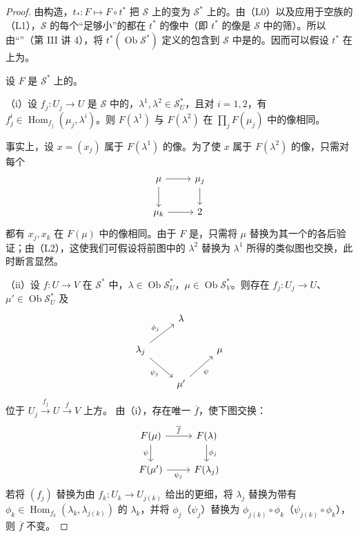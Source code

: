 \begin{proof}
由构造，$t_*:F\mapsto F\circ t^*$ 把 $\mathscr S$ 上的变为 $\mathscr S^*$ 上的。由（L0）以及应用于空族的（L1），$\mathscr S$ 的每个“足够小”的都在 $t^*$ 的像中（即 $t^*$ 的像是 $\mathscr S$ 中的筛）。所以由“”（第 III 讲 4），将 $t^*(\operatorname{Ob}\mathscr S^*)$ 定义的包含到 $\mathscr S$ 中是的。因而可以假设 $t^*$ 在上为。

设 $F$ 是 $\mathscr S^*$ 上的。

（i）设 $f_j:U_j\to U$ 是 $\mathscr S$ 中的，$\lambda^1,\lambda^2\in\mathscr S_U^*$，且对 $i=1,2$，有 $f_j^i\in\operatorname{Hom}_{f_j}(\mu_j,\lambda^i)$。则 $F(\lambda^1)$ 与 $F(\lambda^2)$ 在 $\prod_jF(\mu_j)$ 中的像相同。

事实上，设 $x=(x_j)$ 属于 $F(\lambda^1)$ 的像。为了使 $x$ 属于 $F(\lambda^2)$ 的像，只需对每个
\[\begin{tikzcd}\mu\arrow[r]\arrow[d]&\mu_j\arrow[d]\\\mu_k\arrow[r]&2\end{tikzcd}\]
都有 $x_j,x_k$ 在 $F(\mu)$ 中的像相同。由于 $F$ 是，只需将 $\mu$ 替换为其一个的各后验证；由（L2），这使我们可假设将前图中的 $\lambda^2$ 替换为 $\lambda^1$ 所得的类似图也交换，此时断言显然。

（ii）设 $f:U\to V$ 在 $\mathscr S^*$ 中，$\lambda\in\operatorname{Ob}\mathscr S_U^*$，$\mu\in\operatorname{Ob}\mathscr S_V^*$。则存在 $f_j:U_j\to U$、 $\mu'\in\operatorname{Ob}\mathscr S_U^*$ 及
\[\begin{tikzcd}&\lambda&\\\lambda_j\arrow[ur,"\phi_j"]\arrow[dr,"\psi_j"']&&\mu\\&\mu'\arrow[ur,"\psi"']&\end{tikzcd}\]
位于 $U_j\xrightarrow{f_j}U\xrightarrow{f}V$ 上方。
由（i），存在唯一 $\overline f$，使下图交换：
\[\begin{tikzcd}F(\mu)\arrow[r,"\overline f"]\arrow[d,"\psi"']&F(\lambda)\arrow[d,"\phi_j"]\\
F(\mu')\arrow[r,"\psi_j"']&F(\lambda_j)\end{tikzcd}\]
若将 $(f_j)$ 替换为由 $f_k:U_k\to U_{j(k)}$ 给出的更细，将 $\lambda_j$ 替换为带有 $\phi_k\in\operatorname{Hom}_{f_k}(\lambda_k,\lambda_{j(k)})$ 的 $\lambda_k$，并将 $\phi_j$（$\psi_j$）替换为 $\phi_{j(k)}\circ\phi_k$（$\psi_{j(k)}\circ\phi_k$），则 $\overline f$ 不变。


\end{proof}
